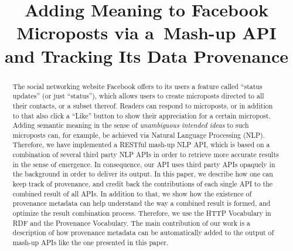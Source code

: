 \documentclass[conference]{IEEEtran}
\begin{document}
%
\title{Adding Meaning to Facebook Microposts via a~Mash-up API and Tracking Its Data Provenance}

\author{
\and
{}
\and
{}
}

\maketitle

\begin{abstract}
The social networking website Facebook offers to its users a feature called ``status updates'' (or just ``status''), which allows users to create microposts directed to all their contacts, or a subset thereof. Readers can respond to microposts, or in addition to that also click a ``Like'' button to show their appreciation for a certain micropost. Adding semantic meaning in the sense of \emph{unambiguous intended ideas} to such microposts can, for example, be achieved via Natural Language Processing (NLP). Therefore, we have implemented a RESTful mash-up NLP API, which is based on a combination of several third party NLP APIs in order to retrieve more accurate results in the sense of emergence. In consequence, our API uses third party APIs opaquely in the background in order to deliver its output. In this paper, we describe how one can keep track of provenance, and credit back the contributions of each single API to the combined result of all APIs. In addition to that, we show how the existence of provenance metadata can help understand the way a combined result is formed, and optimize the result combination process. Therefore, we use the HTTP Vocabulary in RDF and the Provenance Vocabulary. The main contribution of our work is a description of how provenance metadata can be automatically added to the output of mash-up APIs like the one presented in this paper.
\end{abstract}
\end{document}
